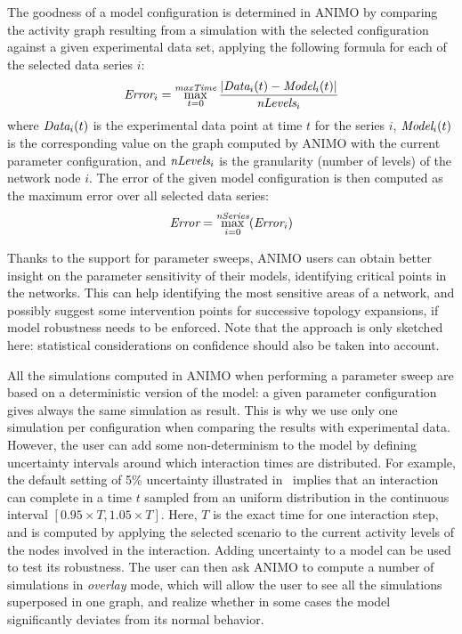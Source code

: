 \documentclass[submission,copyright,creativecommons]{eptcs}
\begin{document}
The goodness of a model configuration is determined in ANIMO by comparing the activity graph
resulting from a simulation with the selected configuration
against a given experimental data set, applying the following formula for each of the selected data series $i$:
$$
\mbox{\it Error}_i = \max_{t = 0}^{\mbox{\it \scriptsize maxTime}} \frac{|\mbox{\it Data}_i(t) - \mbox{\it Model}_i(t)|}{\mbox{\it nLevels}_i}\\
$$
where $\mbox{\it Data}_i(t)$ is the experimental data point at time $t$ for the series $i$, 
$\mbox{\it Model}_i(t)$ is the corresponding value on the graph computed by ANIMO
with the current parameter configuration, and $\mbox{\it nLevels}_i$
is the granularity (number of levels) of the network node $i$.
The error of the given model configuration is then computed as the maximum error over
all selected data series:
$$
\mbox{\it Error} = \max_{i = 0}^{\mbox{\it \scriptsize nSeries}}(\mbox{\it Error}_i)
$$

Thanks to the support for parameter sweeps, ANIMO users can obtain better insight on the
parameter sensitivity of their models, identifying critical points in the networks.
This can help identifying the most sensitive
areas of a network, and possibly suggest some intervention points for successive topology expansions,
if model robustness needs to be enforced. Note that the approach is only sketched here:
statistical considerations on confidence should also be taken into account.

All the simulations computed in ANIMO when performing a parameter sweep are based on
a deterministic version of the model: a given parameter configuration gives always the same
simulation as result. This is why we use only one simulation per configuration
when comparing the results with experimental data. However, the user can add some
non-determinism to the model by defining uncertainty intervals around which interaction
times are distributed. For example, the default setting of 5\% uncertainty illustrated in~\cite{animo-ieee}
implies that an interaction can complete in a time $t$ sampled from an uniform distribution
in the continuous interval $[0.95 \times T, 1.05 \times T]$.
Here, $T$ is the exact time for one interaction step, and is computed by applying
the selected scenario to the current activity levels of the nodes involved in the interaction.
Adding uncertainty to a model can be used to test its robustness. The user can then
ask ANIMO to compute a number of simulations in \emph{overlay} mode,
which will allow the user to see all the simulations superposed in one graph,
and realize whether in some cases the model significantly deviates from its normal behavior.
\end{document}
